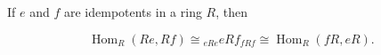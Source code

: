If $e$ and $f$ are idempotents in a ring $R$, then

$$\operatorname{Hom}_R(Re, Rf) \cong {}_{eRe} eRf_{fRf} \cong \operatorname{Hom}_R(fR, eR).$$
